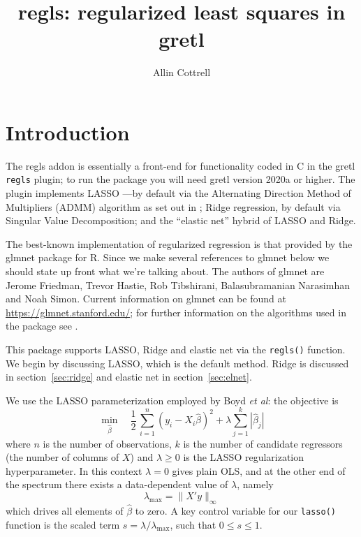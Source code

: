 \documentclass{article}
\title{regls: regularized least squares in gretl}
\author{Allin Cottrell}
\begin{document}
\maketitle

\section{Introduction}
\label{sec:intro}

The \textsf{regls} addon is essentially a front-end for functionality
coded in C in the gretl \texttt{regls} plugin; to run the package you
will need gretl version 2020a or higher.  The plugin implements LASSO
\citep{tibshirani96}---by default via the Alternating Direction Method
of Multipliers (ADMM) algorithm as set out in \cite{boyd2010}; Ridge
regression, by default via Singular Value Decomposition; and the
``elastic net'' hybrid of LASSO and Ridge.

The best-known implementation of regularized regression is that
provided by the \textsf{glmnet} package for \textsf{R}. Since we make
several references to \textsf{glmnet} below we should state up front
what we're talking about. The authors of \textsf{glmnet} are Jerome
Friedman, Trevor Hastie, Rob Tibshirani, Balasubramanian Narasimhan
and Noah Simon. Current information on \textsf{glmnet} can be found at
\url{https://glmnet.stanford.edu/}; for further information on the
algorithms used in the package see \cite{glmnet10}.

This package supports LASSO, Ridge and elastic net via the
\texttt{regls()} function. We begin by discussing LASSO, which is the
default method.  Ridge is discussed in section~\ref{sec:ridge} and
elastic net in section~\ref{sec:elnet}.

We use the LASSO parameterization employed by Boyd \textit{et al}: the
objective is
\begin{equation}
  \label{eq:obj}
  \min_{\hat{\beta}} \quad \frac{1}{2}\,
  \sum_{i=1}^n (y_i - X_i\hat{\beta})^2 + \lambda \sum_{j=1}^k |\hat{\beta}_j|
\end{equation}
where $n$ is the number of observations, $k$ is the number of
candidate regressors (the number of columns of $X$) and
$\lambda \geq 0$ is the LASSO regularization hyperparameter. In this
context $\lambda = 0$ gives plain OLS, and at the other end of the
spectrum there exists a data-dependent value of $\lambda$, namely
\begin{equation}
  \label{eq:lmax}
  \lambda_{\max} = \|X'y\|_{\infty}
\end{equation}
which drives all elements of $\hat{\beta}$ to zero.  A key control
variable for our \texttt{lasso()} function is the scaled term
$s = \lambda/\lambda_{\max}$, such that $0 \leq s \leq 1$.
\end{document}
